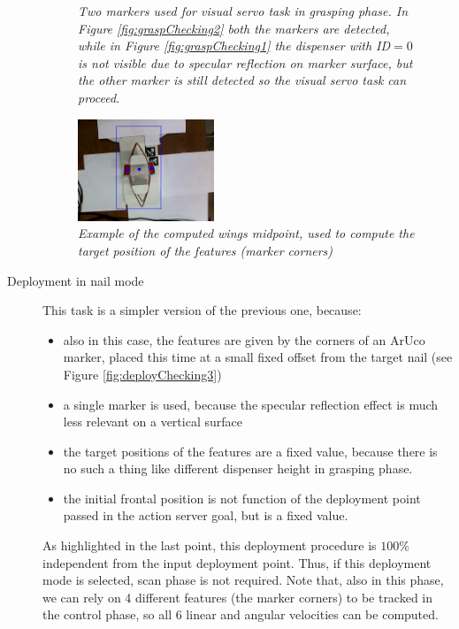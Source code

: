 \begin{description}
\begin{figure}
	\caption{\textit{Two markers used for visual servo task in grasping phase. In Figure \ref{fig:graspChecking2} both the markers are detected, while in Figure \ref{fig:graspChecking1} the dispenser with ID$=0$ is not visible due to specular reflection on marker surface, but the other marker is still detected so the visual servo task can proceed.}}
	\label{fig:twoMarkersControl}
\end{figure}


\begin{figure}
	\centering
	\includegraphics[width=0.4\textwidth]{Images/arm/depth_estimation_2.png}
	\caption{\textit{Example of the computed wings midpoint, used to compute the target position of the features (marker corners)}}
	\label{fig:computedFeatures}
\end{figure}

	\item[Deployment in nail mode] This task is a simpler version of the previous one, because:
	\begin{itemize}
		\item also in this case, the features are given by the corners of an ArUco marker, placed this time at a small fixed offset from the target nail (see Figure \ref{fig:deployChecking3})
		\item a single marker is used, because the specular reflection effect is much less relevant on a vertical surface 
		\item the target positions of the features are a fixed value, because there is no such a thing like different dispenser height in grasping phase.
		\item the initial frontal position is not function of the deployment point passed in the action server goal, but is a fixed value.
	\end{itemize}
As highlighted in the last point, this deployment procedure is $100\%$ independent from the input deployment point. Thus, if this deployment mode is selected, scan phase is not required.
	Note that, also in this phase, we can rely on 4 different features (the marker corners) to be tracked in the control phase, so all 6 linear and angular velocities can be computed.
	

\end{description}

